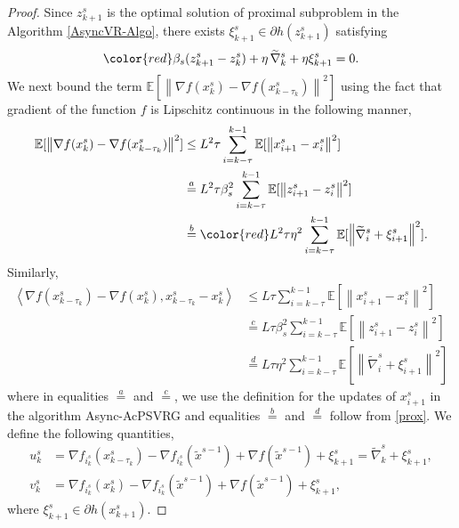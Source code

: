\documentclass[10pt, conference, compsocconf]{IEEEtran}
\newcommand*{\E}{\mathbb{E}}
\newcommand*{\VRG}{\,\widetilde{\nabla}_k^s}
\newcommand{\norm}[1]{\left\lVert#1\right\rVert}
\newcommand{\Iprod}[2]{\left\langle #1,#2\right\rangle}
\theoremstyle{definition}
\theoremstyle{remark}
\begin{document}
\begin{proof}
Since $z_{k+1}^s$ is the optimal solution of proximal subproblem in the Algorithm \ref{AsyncVR-Algo}, there exists ${\xi}_{k+1}^s\in\partial h(z_{k+1}^s)$ satisfying
\begin{equation}\label{prox}
{\color{red}\beta_s}(z_{k+1}^s - z_{k}^s) + \eta\VRG + \eta{\xi}_{k+1}^s = 0.
\end{equation}
We next bound the term $\E[\norm{\nabla f(x_{k}^s)-\nabla f(x_{k-\tau_k}^s)}^2]$ using the fact that gradient of the function $f$ is Lipschitz continuous in the following manner,
\begin{equation}\label{Eq5-Lemma1}
\begin{split}
\E[\norm{\nabla f(x_{k}^s)-\nabla f(x_{k-\tau_k}^s)}^2]&\leq L^2\tau \sum_{i = k-\tau}^{k-1}\E[\norm{x_{i+1}^s-x_{i}^s}^2]\\
&\stackrel{a}{=} L^2\tau\beta_s^2\sum_{i = k-\tau}^{k-1}\E[\norm{z_{i+1}^s-z_{i}^s}^2] \\
&\stackrel{b}{=} {\color{red} L^2\tau\eta^2\sum_{i = k-\tau}^{k-1}\E[\norm{\widetilde{\nabla}_{i}^s+{\xi}_{i+1}^s}^2]}.
\end{split}
\end{equation}
Similarly,
\begin{equation}\label{Eq5p-Lemma1}
\begin{split}
\Iprod{\nabla f(x_{k-\tau_k}^s)-\nabla f(x_{k}^s)}{x_{k-\tau_k}^s-{x}^{s}_{k}}&\leq L\tau \sum_{i = k-\tau}^{k-1}\E[\norm{x_{i+1}^s-x_{i}^s}^2]\\
&\stackrel{c}{=} L\tau\beta_s^2\sum_{i = k-\tau}^{k-1}\E[\norm{z_{i+1}^s-z_{i}^s}^2] \\
&\stackrel{d}{=}  L\tau\eta^2\sum_{i = k-\tau}^{k-1}\E[\norm{\widetilde{\nabla}_{i}^s+{\xi}_{i+1}^s}^2]
\end{split}
\end{equation}
where in equalities $\stackrel{a}{=}$ and  $\stackrel{c}{=}$, we use the definition for the updates of $x_{i+1}^s$ in the algorithm Async-AcPSVRG and equalities $\stackrel{b}{=}$ and $\stackrel{d}{=}$ follow from \eqref{prox}.
We define the following quantities,
\begin{equation}
\begin{split}
u_k^s &= \nabla f_{i_k^s}(x_{k-\tau_k}^s) - \nabla f_{i_k^s}(\widetilde{x}^{s-1}) + \nabla f(\widetilde{x}^{s-1})+{\xi}_{k+1}^s = {\widetilde{\nabla}_{k}^s}+{\xi}_{k+1}^s,\\
v_k^s &= \nabla f_{i_k^s}(x_{k}^s) - \nabla f_{i_k^s}(\widetilde{x}^{s-1}) + \nabla f(\widetilde{x}^{s-1})+{\xi}_{k+1}^s,
\end{split}
\end{equation}
where ${\xi}_{k+1}^s\in\partial h(x_{k+1}^s)$.


\end{proof}
\end{document}
